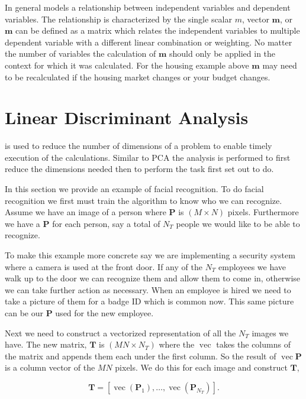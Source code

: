 In general  models a relationship between independent variables and dependent variables. The relationship is characterized by the single scalar $m$, vector $\mathbf{m}$, or $\mathbf{m}$ can be defined as a matrix which relates the independent variables to multiple dependent variable with a different linear combination or weighting. No matter the number of variables the calculation of $\mathbf{m}$ should only be applied in the context for which it was calculated. For the housing example above $\mathbf{m}$ may need to be recalculated if the housing market changes or your budget changes. 


\section{Linear Discriminant Analysis}

 is used to reduce the number of dimensions of a problem to enable timely execution of the calculations. Similar to \ac{PCA} the analysis is performed to first reduce the dimensions needed then to perform the task first set out to do. 

In this section we provide an example of facial recognition. To do facial recognition we first must train the algorithm to know who we can recognize. Assume we have an image of a person where $\mathbf{P}$ is $(M\times N)$ pixels. Furthermore we have a $\mathbf{P}$ for each person, say a total of $N_T$ people we would like to be able to recognize. 

To make this example more concrete say we are implementing a security system where a camera is used at the front door. If any of the $N_T$ employees we have walk up to the door we can recognize them and allow them to come in, otherwise we can take further action as necessary. When an employee is hired we need to take a picture of them for a badge \ac{ID} which is common now. This same picture can be our $\mathbf{P}$ used for the new employee. 

Next we need to construct a vectorized representation of all the $N_T$ images we have. The new matrix, $\mathbf{T}$ is $(MN\times N_T)$ where the $\operatorname{vec}$ takes the columns of the matrix and appends them each under the first column. So the result of $\operatorname{vec}{\mathbf{P}}$ is a column vector of the $MN$ pixels. We do this for each image and construct $\mathbf{T}$,
	
\begin{equation}
\mathbf{T} = \left[\operatorname{vec}(\mathbf{P}_1),\dots,\operatorname{vec}(\mathbf{P}_{N_T})\right].
\end{equation}	
	
